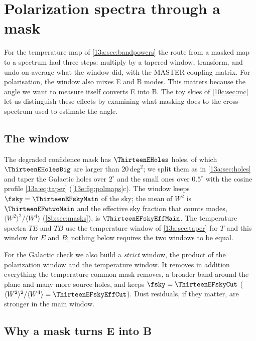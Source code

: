 \section{Polarization spectra through a mask}
\label{13e:sec:spectra}

For the temperature map of \cref{13a:sec:bandpowers} the route from a masked map to a spectrum had three
steps: multiply by a tapered window, transform, and undo on average what the window did, with the MASTER
coupling matrix. For polarisation, the window also mixes E and B modes. This matters because
the angle we want to measure itself converts E into B. The toy skies of
\cref{10c:sec:mc} let us distinguish these effects by examining what masking
does to the cross-spectrum used to estimate the angle.

\subsection{The window}
\label{13e:sec:window}

The degraded confidence mask has $\ThirteenEHoles$ holes, of which $\ThirteenEHolesBig$ are larger than
$20\,\mathrm{deg}^2$; we split them as in \cref{13a:sec:holes} and taper the Galactic holes over $2^\circ$
and the small ones over $0.5^\circ$ with the cosine profile \eqref{13a:eq:taper}
(\cref{13e:fig:polmaps}c). The window keeps $\fsky=\ThirteenEFskyMain$ of the sky; the mean of $W^2$ is
$\ThirteenEFwtwoMain$ and the effective sky fraction that counts modes, $\langle W^2\rangle^2/\langle W^4\rangle$
(\cref{8b:sec:masks}), is $\ThirteenEFskyEffMain$. The temperature spectra $TE$ and $TB$ use the temperature
window of \cref{13a:sec:taper} for $T$ and this window for $E$ and $B$; nothing below requires the two
windows to be equal.

For the Galactic check we also build a \emph{strict} window, the product of the polarization window and the
temperature window. It removes in addition everything the temperature common mask removes, a broader
band around the plane and many more source holes, and keeps $\fsky=\ThirteenEFskyCut$
($\langle W^2\rangle^2/\langle W^4\rangle=\ThirteenEFskyEffCut$). Dust residuals, if they matter, are stronger
in the main window.

\subsection{Why a mask turns E into B}
\label{13e:sec:leakage}

